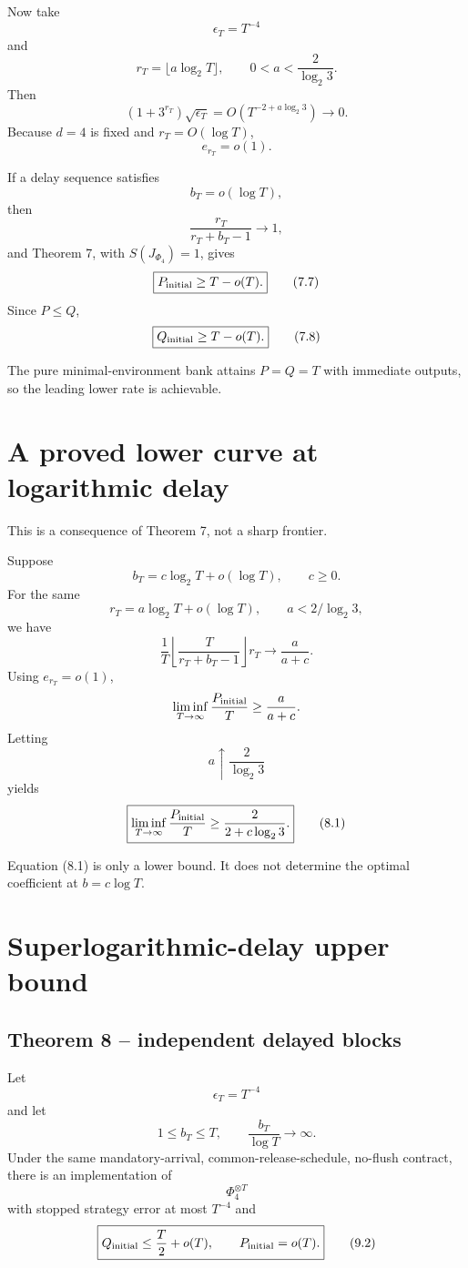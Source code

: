 \documentclass[11pt,a4paper]{article}
\numberwithin{equation}{section}
\begin{document}
Now take \[
\epsilon_T=T^{-4}
\] and \[
r_T=\lfloor a\log_2T\rfloor,
\qquad
0<a<\frac2{\log_2 3}.
\] Then \[
(1+3^{r_T})\sqrt{\epsilon_T}
=
O\!\left(
T^{-2+a\log_2 3}
\right)
\to0.
\] Because \(d=4\) is fixed and \(r_T=O(\log T)\), \[
e_{r_T}=o(1).
\tag{7.6}
\]

If a delay sequence satisfies \[
b_T=o(\log T),
\] then \[
\frac{r_T}{r_T+b_T-1}\to1,
\] and Theorem 7, with \(S(J_{\Phi_4})=1\), gives \[
\boxed{
P_{\rm initial}\ge T-o(T).
}
\tag{7.7}
\] Since \(P\le Q\), \[
\boxed{
Q_{\rm initial}\ge T-o(T).
}
\tag{7.8}
\]

The pure minimal-environment bank attains \(P=Q=T\) with immediate
outputs, so the leading lower rate is achievable.

\section{A proved lower curve at logarithmic
delay}\label{a-proved-lower-curve-at-logarithmic-delay}

This is a consequence of Theorem 7, not a sharp frontier.

Suppose \[
b_T=c\log_2T+o(\log T),
\qquad c\ge0.
\] For the same \[
r_T=a\log_2T+o(\log T),
\qquad
a<2/\log_2 3,
\] we have \[
\frac1T
\left\lfloor
\frac{T}{r_T+b_T-1}
\right\rfloor r_T
\longrightarrow
\frac{a}{a+c}.
\] Using \(e_{r_T}=o(1)\), \[
\liminf_{T\to\infty}
\frac{P_{\rm initial}}T
\ge
\frac{a}{a+c}.
\] Letting \[
a\uparrow\frac2{\log_2 3}
\] yields \[
\boxed{
\liminf_{T\to\infty}
\frac{P_{\rm initial}}T
\ge
\frac{2}{2+c\log_2 3}.
}
\tag{8.1}
\]

Equation (8.1) is only a lower bound. It does not determine the optimal
coefficient at \(b=c\log T\).

\section{Superlogarithmic-delay upper
bound}\label{superlogarithmic-delay-upper-bound}

\subsection*{Theorem 8 -- independent delayed
blocks}\label{theorem-8-independent-delayed-blocks}

Let \[
\epsilon_T=T^{-4}
\] and let \[
1\le b_T\le T,
\qquad
\frac{b_T}{\log T}\to\infty.
\tag{9.1}
\] Under the same mandatory-arrival, common-release-schedule, no-flush
contract, there is an implementation of \[
\Phi_4^{\otimes T}
\] with stopped strategy error at most \(T^{-4}\) and \[
\boxed{
Q_{\rm initial}
\le
\frac T2+o(T),
\qquad
P_{\rm initial}=o(T).
}
\tag{9.2}
\]
\end{document}
